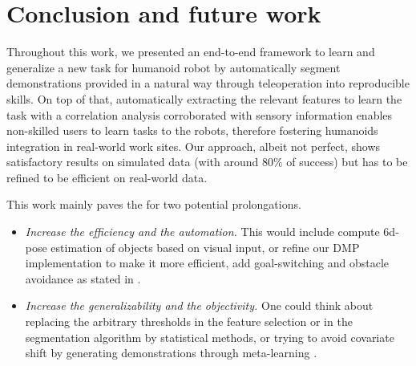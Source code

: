 \documentclass[a4paper, 10pt, conference]{ieeeconf}
\begin{document}
\section{Conclusion and future work}\label{conclusion}

Throughout this work, we presented an end-to-end framework to learn and generalize a new task for humanoid robot by automatically segment demonstrations provided in a natural way through teleoperation into reproducible skills. 
On top of that, automatically extracting the relevant features to learn the task with a correlation analysis corroborated with sensory information enables non-skilled users to learn tasks to the robots, therefore fostering humanoids integration in real-world work sites. Our approach, albeit not perfect, shows satisfactory results on simulated data (with around 80\% of success) but has to be refined to be efficient on real-world data. \newline


This work mainly paves the for two potential prolongations.
\begin{itemize}
    \item \textit{Increase the efficiency and the automation.} This would include compute 6d-pose estimation of objects based on visual input, or refine our DMP implementation to make it more efficient, add goal-switching and obstacle avoidance as stated in \cite{saveriano_dynamic_2021}. 
    
    \item  \textit{Increase the generalizability and the objectivity.} One could think about replacing the arbitrary thresholds in the feature selection or in the segmentation algorithm by statistical methods, or trying to avoid covariate shift by generating demonstrations through meta-learning \cite{yu_one-shot_2018}.

\end{itemize}




\vspace{12pt}
\end{document}
